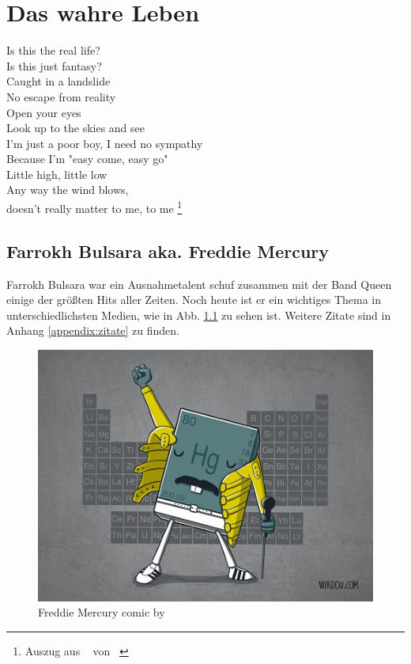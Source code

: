 \chapter{Das wahre Leben}

\begin{center}
Is this the real life? \\
Is this just fantasy? \\
Caught in a landslide \\
No escape from reality \\
Open your eyes \\
Look up to the skies and see \\
I'm just a poor boy, I need no sympathy \\
Because I'm "{}easy come, easy go"{} \\ %
Little high, little low \\
Any way the wind blows, \\
doesn't really matter to me, 
to me \footnote{Auszug aus ~\cite{BohemRhap} von \citeauthor{Queen}~\cite{Queen} }\\
\end{center}

\section{Farrokh Bulsara aka. Freddie Mercury}

Farrokh Bulsara war ein Ausnahmetalent schuf zusammen mit der Band Queen einige der größten Hits aller Zeiten. Noch heute ist er ein wichtiges Thema in unterschiedlichsten Medien, wie in Abb. \ref{fig:freddiehg} zu sehen ist. Weitere Zitate sind in Anhang \ref{appendix:zitate} zu finden.
\begin{figure}
\begin{center} \includegraphics{figures/freddie_mercury_by_wirdoudesigns.jpg} \end{center}
\caption{Freddie Mercury comic by~\citeauthor{wirdou}~\cite{wirdou}}
\label{fig:freddiehg}
\end{figure}

\newpage